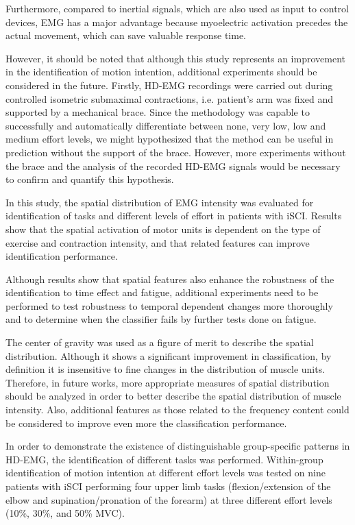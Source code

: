 Furthermore, compared to inertial signals, which are also used as input to control devices, EMG has a major advantage because myoelectric activation precedes the actual movement, which can save valuable response time.

However, it should be noted that although this study represents an improvement in the identification of motion intention, additional experiments should be considered in the future. Firstly, HD-EMG recordings were carried out during controlled isometric submaximal contractions, i.e. patient’s arm was fixed and supported by a mechanical brace. Since the methodology was capable to successfully and automatically differentiate between none, very low, low and medium effort levels, we might hypothesized that the method can be useful in prediction without the support of the brace. However, more experiments without the brace and the analysis of the recorded HD-EMG signals would be necessary to confirm and quantify this hypothesis.

In this study, the spatial distribution of EMG intensity was evaluated for identification of tasks and different levels of effort in patients with iSCI. Results show that the spatial activation of motor units is dependent on the type of exercise and contraction intensity, and that related features can improve identification performance.

Although results show that spatial features also enhance the robustness of the identification to time effect and fatigue, additional experiments need to be performed to test robustness to temporal dependent changes more thoroughly and to determine when the classifier fails by further tests done on fatigue.

The center of gravity was used as a figure of merit to describe the spatial distribution. Although it shows a significant improvement in classification, by definition it is insensitive to fine changes in the distribution of muscle units. Therefore, in future works, more appropriate measures of spatial distribution should be analyzed in order to better describe the spatial distribution of muscle intensity. Also, additional features as those related to the frequency content could be considered to improve even more the classification performance.


In order to demonstrate the existence of distinguishable group-specific patterns in HD-EMG, the identification of different tasks was performed. Within-group identification of motion intention at different effort levels was tested on nine patients with iSCI performing four upper limb tasks (flexion/extension of the elbow and supination/pronation of the forearm) at three different effort levels (10\%, 30\%, and 50\% MVC). 

